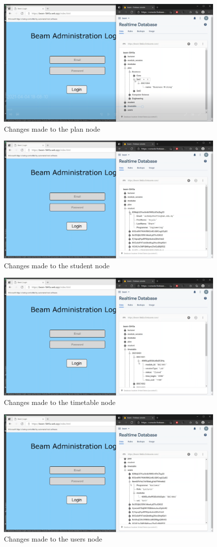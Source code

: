 \documentclass[../report.tex]{subfiles}
\begin{document}
\begin{figure}[H]
	\centering
	\includegraphics[width=.7\linewidth]{../images/07/01-10-test-plan.png}
	\caption{Changes made to the plan node}
	\label{fig:07-01-10-test-plan}
\end{figure}
\begin{figure}[H]
	\centering
	\includegraphics[width=.7\linewidth]{../images/07/01-11-test-student.png}
	\caption{Changes made to the student node}
	\label{fig:07-01-11-test-student}
\end{figure}
\begin{figure}[H]
	\centering
	\includegraphics[width=.7\linewidth]{../images/07/01-12-test-timetable.png}
	\caption{Changes made to the timetable node}
	\label{fig:07-01-12-test-timetable}
\end{figure}
\begin{figure}[H]
	\centering
	\includegraphics[width=.7\linewidth]{../images/07/01-13-test-users.png}
	\caption{Changes made to the users node}
	\label{fig:07-01-13-test-users}
\end{figure}
\end{document}

